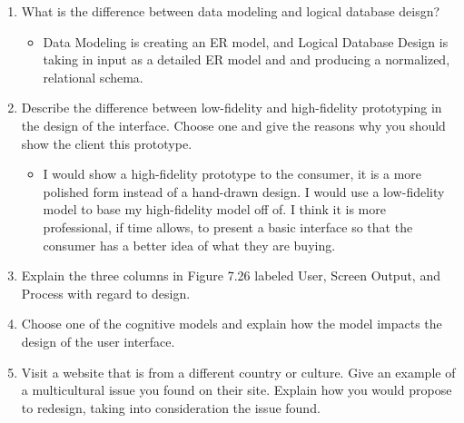 \documentclass[11pt]{article}
\begin{document}
\begin{enumerate}
    \item What is the difference between data modeling and logical database deisgn?
    \begin{itemize}
        \item[] Data Modeling is creating an ER model, and Logical Database Design is taking in input as a detailed ER model and and producing a normalized, relational schema.
    \end{itemize}

    \item Describe the difference between low-fidelity and high-fidelity prototyping in the design of the interface. Choose one and give the reasons why you should show the client this prototype. 
    \begin{itemize}
        \item[] I would show a high-fidelity prototype to the consumer, it is a more polished form instead of a hand-drawn design. I would use a low-fidelity model to base my high-fidelity model
        off of. I think it is more professional, if time allows, to present a basic interface so that the consumer has a better idea of what they are buying.
    \end{itemize}

    \item Explain the three columns in Figure 7.26 labeled User, Screen Output, and Process with regard to design. 

    \item Choose one of the cognitive models and explain how the model impacts the design of the user interface. 

    \item Visit a website that is from a different country or culture. Give an example of a multicultural 
    issue you found on their site. Explain how you would propose to redesign, taking into consideration the issue found. 
    
    \end{enumerate}
    
    
\end{document}

